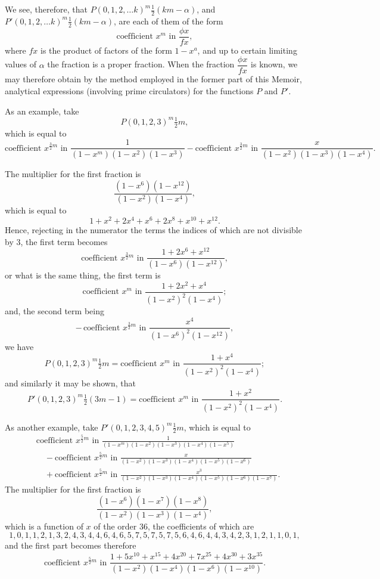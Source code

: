 \documentclass[11pt]{article}
\begin{document}
We see, therefore, that $P(0, 1, 2, \ldots k)^m \tfrac{1}{2}(km - \alpha)$, and $P'(0, 1, 2, \ldots k)^m \tfrac{1}{2}(km - \alpha)$, are each of them of the form
\[
\text{coefficient } x^m \text{ in } \frac{\phi x}{f x},
\]
where $f x$ is the product of factors of the form $1 - x^a$, and up to certain limiting values of $\alpha$ the fraction is a proper fraction. When the fraction $\dfrac{\phi x}{f x}$ is known, we may therefore obtain by the method employed in the former part of this Memoir, analytical expressions (involving prime circulators) for the functions $P$ and $P'$.

As an example, take
\[
P(0, 1, 2, 3)^m \tfrac{1}{2}m,
\]
which is equal to
\[
\text{coefficient } x^{\frac{3}{2}m} \text{ in } \frac{1}{(1-x^m)(1-x^2)(1-x^3)} - \text{coefficient } x^{\frac{3}{2}m} \text{ in } \frac{x}{(1-x^2)(1-x^3)(1-x^4)}.
\]

The multiplier for the first fraction is
\[
\frac{(1 - x^6)(1 - x^{12})}{(1 - x^2)(1 - x^4)},
\]
which is equal to
\[
1 + x^2 + 2 x^4 + x^6 + 2 x^8 + x^{10} + x^{12}.
\]
Hence, rejecting in the numerator the terms the indices of which are not divisible by 3, the first term becomes
\[
\text{coefficient } x^{\frac{3}{2}m} \text{ in } \frac{1 + 2 x^6 + x^{12}}{(1 - x^6)(1 - x^{12})},
\]
or what is the same thing, the first term is
\[
\text{coefficient } x^m \text{ in } \frac{1 + 2 x^2 + x^4}{(1 - x^2)^2 (1 - x^4)};
\]
and, the second term being
\[
-\,\text{coefficient } x^{\frac{3}{2}m} \text{ in } \frac{x^4}{(1 - x^6)^2 (1 - x^{12})},
\]
we have
\[
P(0, 1, 2, 3)^m \tfrac{1}{2}m = \text{coefficient } x^m \text{ in } \frac{1 + x^4}{(1 - x^2)^2 (1 - x^4)};
\]
and similarly it may be shown, that
\[
P'(0, 1, 2, 3)^m \tfrac{1}{2}(3m - 1) = \text{coefficient } x^m \text{ in } \frac{1 + x^2}{(1 - x^2)^2(1 - x^4)}.
\]

As another example, take $P'(0, 1, 2, 3, 4, 5)^m \tfrac{1}{2}m$, which is equal to
\begin{align*}
&\text{coefficient } x^{\frac{5}{2}m} \text{ in } \frac{1}{(1-x^m)(1-x^2)(1-x^3)(1-x^4)(1-x^5)} \\
&\quad - \text{coefficient } x^{\frac{5}{2}m} \text{ in } \frac{x}{(1-x^2)(1-x^3)(1-x^4)(1-x^5)(1-x^6)} \\
&\quad + \text{coefficient } x^{\frac{5}{2}m} \text{ in } \frac{x^3}{(1-x^2)(1-x^3)(1-x^4)(1-x^5)(1-x^6)(1-x^7)}.
\end{align*}
The multiplier for the first fraction is
\[
\frac{(1 - x^6)(1 - x^7)(1 - x^8)}{(1 - x^2)(1 - x^3)(1 - x^4)},
\]
which is a function of $x$ of the order 36, the coefficients of which are
\[
1, 0, 1, 1, 2, 1, 3, 2, 4, 3, 4, 4, 6, 4, 6, 5, 7, 5, 7, 5, 7, 5, 6, 4, 6, 4, 4, 3, 4, 2, 3, 1, 2, 1, 1, 0, 1,
\]
and the first part becomes therefore
\[
\text{coefficient } x^{\frac{5}{2}m} \text{ in } \frac{1 + 5 x^{10} + x^{15} + 4 x^{20} + 7 x^{25} + 4 x^{30} + 3 x^{35}}{(1 - x^2)(1 - x^4)(1 - x^6)(1 - x^{10})}.
\]
\end{document}
